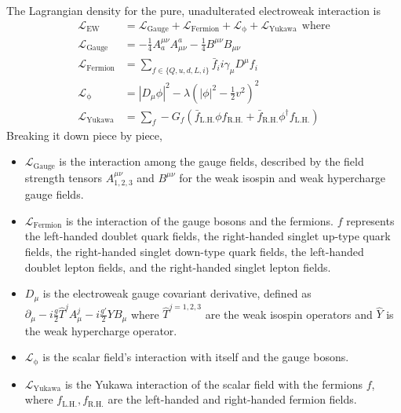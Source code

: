 The Lagrangian density for the pure, unadulterated electroweak interaction is
\begin{equation}
\begin{split}
\label{eq:EWpreSSB}
\mathcal{L}_\mathrm{EW} & = \mathcal{L}_\mathrm{Gauge} + \mathcal{L}_\mathrm{Fermion} + \mathcal{L}_\mathrm{\phi} + \mathcal{L}_\mathrm{Yukawa} \:\:\mathrm{where} \\
\mathcal{L}_\mathrm{Gauge}   & = -\frac{1}{4}A^{\mu\nu}_a A^a_{\mu\nu} - \frac{1}{4} B^{\mu\nu} B_{\mu\nu} \\
\mathcal{L}_\mathrm{Fermion} & = \sum_{f \in \{Q,u,d,L,i\}} \bar{f}_i i \gamma_\mu D^\mu f_i \\ 
\mathcal{L}_\mathrm{\phi}   & = |D_\mu \phi|^2 - \lambda \left( |\phi|^2 - \frac{1}{2} v^2 \right)^2 \\
\mathcal{L}_\mathrm{Yukawa}  & = \sum_f -G_f (\bar{f}_\mathrm{L.H.} \phi f_\mathrm{R.H.} + \bar{f}_\mathrm{R.H.} \phi^\dagger f_\mathrm{L.H.} )
\end{split}
\end{equation}
Breaking it down piece by piece, 
\begin{itemize}
  \setlength\itemsep{0em}
  \item $\mathcal{L}_\mathrm{Gauge}$ is the interaction among the gauge fields, described by the field strength tensors $A_{1,2,3}^{\mu\nu}$ and $B^{\mu\nu}$ for the weak isospin and weak hypercharge gauge fields.
  \item $\mathcal{L}_\mathrm{Fermion}$ is the interaction of the gauge bosons and the fermions. $f$ represents the left-handed doublet quark fields, the right-handed singlet up-type quark fields, the right-handed singlet down-type quark fields, the left-handed doublet lepton fields, and the right-handed singlet lepton fields. 
  \item $D_\mu$ is the electroweak gauge covariant derivative, defined as 
    $\partial_\mu - i\frac{g}{2} \hat{T}^j A^{j}_{\mu} - i \frac{g'}{2} Y B_\mu $ where $\hat{T}^{j=1,2,3}$ are the weak isospin operators and $\hat{Y}$ is the weak hypercharge operator. 
  \item $\mathcal{L}_\mathrm{\phi}$ is the scalar field's interaction with itself and the gauge bosons.
  \item $\mathcal{L}_\mathrm{Yukawa}$ is the Yukawa interaction of the scalar field with the fermions $f$, where $f_\mathrm{L.H.}, f_\mathrm{R.H.}$ are the left-handed and right-handed fermion fields.
\end{itemize}

